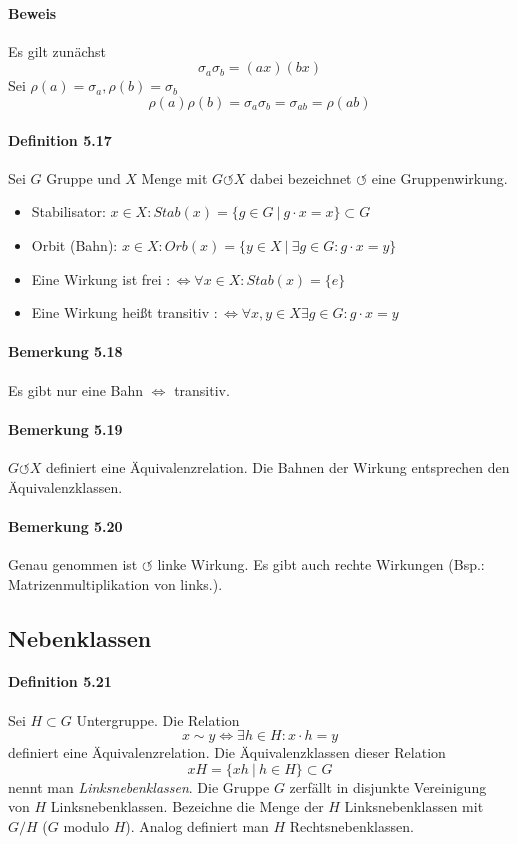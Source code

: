 \documentclass{scrartcl}
\begin{document}
\paragraph{Beweis}
Es gilt zunächst
\[
  \sigma_a\sigma_b=(ax)(bx)
\]
Sei $\rho(a)=\sigma_a, \rho(b)=\sigma_b$
\[
  \rho(a)\rho(b)=\sigma_a\sigma_b=\sigma_{ab}=\rho(ab)
\]

\paragraph{Definition 5.17} Sei $G$ Gruppe und $X$ Menge mit $G \circlearrowleft
X$ dabei bezeichnet $\circlearrowleft$ eine Gruppenwirkung.
\begin{itemize}
\item Stabilisator: $x \in X: Stab(x) = \{g \in G ~|~ g \cdot x = x\}
  \subset G$
\item Orbit (Bahn): $x \in X: Orb(x) = \{y \in X ~|~ \exists g \in G: g \cdot x
  = y\}$
\item Eine Wirkung ist frei $:\Leftrightarrow \forall x \in X: Stab(x) = \{e\}$
\item Eine Wirkung heißt transitiv $:\Leftrightarrow \forall x,y \in X \exists g
  \in G: g \cdot x = y$
\end{itemize}

\paragraph{Bemerkung 5.18} Es gibt nur eine Bahn $\Leftrightarrow$ transitiv.
\paragraph{Bemerkung 5.19} $G \circlearrowleft X$ definiert eine
Äquivalenzrelation. Die Bahnen der Wirkung entsprechen den Äquivalenzklassen.
\paragraph{Bemerkung 5.20} Genau genommen ist $\circlearrowleft$ linke Wirkung.
Es gibt auch rechte Wirkungen (Bsp.: Matrizenmultiplikation von links.).

\subsection{Nebenklassen}
\label{subsec:nebenklassen}

\paragraph{Definition 5.21} Sei $H \subset G$ Untergruppe. Die Relation
\[
  x \sim y \Leftrightarrow \exists h \in H: x \cdot h = y
\]
definiert eine Äquivalenzrelation. Die Äquivalenzklassen dieser Relation
\[
  xH = \{xh ~|~ h \in H\} \subset G
\]
nennt man \textit{Linksnebenklassen}. Die Gruppe $G$ zerfällt in disjunkte
Vereinigung von $H$ Linksnebenklassen.
Bezeichne die Menge der $H$ Linksnebenklassen mit $G/H$ ($G$ modulo $H$).
Analog definiert man $H$ Rechtsnebenklassen.
\end{document}

